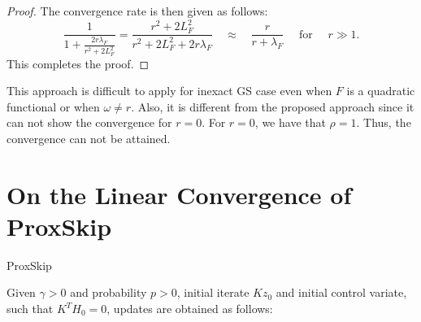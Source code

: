 \begin{itemize}
\begin{proof}
The convergence rate is then given as follows: 
\begin{equation}
\frac{1}{1 + \frac{2r\lambda_F}{r^2 + 2L_F^2}} = \frac{r^2 + 2L_F^2}{r^2 + 2L_F^2 + 2r\lambda_F} \quad \approx \quad \frac{r}{r + \lambda_F} \quad \mbox{ for } \quad r \gg 1. 
\end{equation}
This completes the proof. 
\end{proof}
\begin{remark}
This approach is difficult to apply for inexact GS case even when $F$ is a quadratic functional or when $\omega \neq r$. Also, it is different from the proposed approach since it can not show the convergence for $r = 0$. For $r = 0$, we have that $\rho = 1$. Thus, the convergence can not be attained. 
\end{remark}

\section{On the Linear Convergence of ProxSkip} 

\begin{algorithm}
\caption{ProxSkip}\label{Prox} 
Given $\gamma > 0$ and probability $p > 0$, initial iterate $Kz_0$ and initial control variate, such that $K^TH_0 = 0$, updates are obtained as follows:  
\begin{algorithmic}
    \Else{}
    \EndIf
\EndFor
\end{algorithmic}
\end{algorithm}



\end{itemize}
